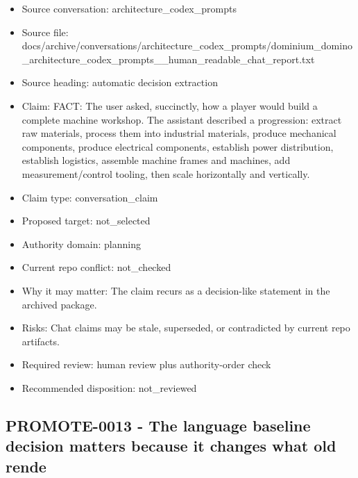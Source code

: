 \documentclass[11pt,a4paper]{report}
\begin{document}
\begin{itemize}
\item Source conversation: architecture\_codex\_prompts
\item Source file: docs/archive/conversations/architecture\_codex\_prompts/dominium\_domino\_architecture\_codex\_prompts\_\_human\_readable\_chat\_report.txt
\item Source heading: automatic decision extraction
\item Claim: FACT: The user asked, succinctly, how a player would build a complete machine workshop. The assistant described a progression: extract raw materials, process them into industrial materials, produce mechanical components, produce electrical components, establish power distribution, establish logistics, assemble machine frames and machines, add measurement/control tooling, then scale horizontally and vertically.
\item Claim type: conversation\_claim
\item Proposed target: not\_selected
\item Authority domain: planning
\item Current repo conflict: not\_checked
\item Why it may matter: The claim recurs as a decision-like statement in the archived package.
\item Risks: Chat claims may be stale, superseded, or contradicted by current repo artifacts.
\item Required review: human review plus authority-order check
\item Recommended disposition: not\_reviewed
\end{itemize}

\subsection{PROMOTE-0013 - The language baseline decision matters because it changes what old rende}
\end{document}
